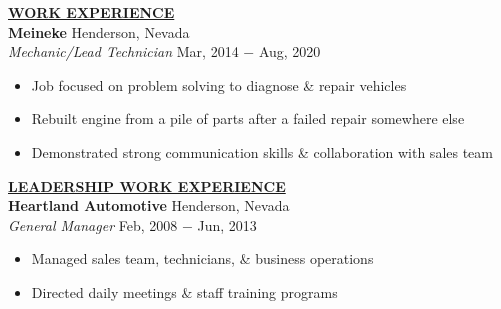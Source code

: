 \documentclass{article}
\begin{document}
% 
%
\noindent \textbf{\underline{WORK EXPERIENCE}} \\
\noindent \textbf{Meineke} \hfill Henderson, Nevada \\
\textit{Mechanic/Lead Technician} \hfill Mar, 2014 $-$ Aug, 2020
\begin{itemize}[noitemsep,nolistsep,leftmargin=*]
\item {Job focused on problem solving to diagnose \& repair vehicles}
\item {Rebuilt engine from a pile of parts after a failed repair somewhere else}
\item {Demonstrated strong communication skills \& collaboration with sales team \\}
\end{itemize}

% 
%
\noindent \textbf{\underline{LEADERSHIP WORK EXPERIENCE}} \\
\noindent \textbf{Heartland Automotive} \hfill Henderson, Nevada \\
\textit{General Manager} \hfill Feb, 2008 $-$ Jun, 2013
\begin{itemize}[noitemsep,nolistsep,leftmargin=*]
\item {Managed sales team, technicians, \& business operations}
\item {Directed daily meetings \& staff training programs \\}
\end{itemize}
\end{document}

